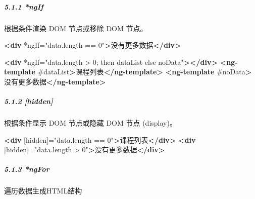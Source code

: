\documentclass[
]{article}
\newenvironment{Shaded}{}{}
\newcommand{\KeywordTok}[1]{\textcolor[rgb]{0.00,0.44,0.13}{\textbf{#1}}}
\newcommand{\NormalTok}[1]{#1}
\newcommand{\OtherTok}[1]{\textcolor[rgb]{0.00,0.44,0.13}{#1}}
\newcommand{\StringTok}[1]{\textcolor[rgb]{0.25,0.44,0.63}{#1}}
\begin{document}
\hypertarget{511-ngif}{%
\subparagraph{\texorpdfstring{5.1.1 *ngIf
}{5.1.1 *ngIf }}\label{511-ngif}}

根据条件渲染 DOM 节点或移除 DOM 节点。

\begin{Shaded}
\begin{Highlighting}[]
\KeywordTok{\textless{}div}\OtherTok{ *ngIf=}\StringTok{"data.length == 0"}\KeywordTok{\textgreater{}}\NormalTok{没有更多数据}\KeywordTok{\textless{}/div\textgreater{}}
\end{Highlighting}
\end{Shaded}

\begin{Shaded}
\begin{Highlighting}[]
\KeywordTok{\textless{}div}\OtherTok{ *ngIf=}\StringTok{"data.length \textgreater{} 0; then dataList else noData"}\KeywordTok{\textgreater{}\textless{}/div\textgreater{}}
\KeywordTok{\textless{}ng{-}template}\OtherTok{ \#dataList}\KeywordTok{\textgreater{}}\NormalTok{课程列表}\KeywordTok{\textless{}/ng{-}template\textgreater{}}
\KeywordTok{\textless{}ng{-}template}\OtherTok{ \#noData}\KeywordTok{\textgreater{}}\NormalTok{没有更多数据}\KeywordTok{\textless{}/ng{-}template\textgreater{}}
\end{Highlighting}
\end{Shaded}

\hypertarget{512-hidden}{%
\subparagraph{5.1.2 {[}hidden{]}}\label{512-hidden}}

根据条件显示 DOM 节点或隐藏 DOM 节点 (display)。

\begin{Shaded}
\begin{Highlighting}[]
\KeywordTok{\textless{}div}\OtherTok{ [hidden]=}\StringTok{"data.length == 0"}\KeywordTok{\textgreater{}}\NormalTok{课程列表}\KeywordTok{\textless{}/div\textgreater{}}
\KeywordTok{\textless{}div}\OtherTok{ [hidden]=}\StringTok{"data.length \textgreater{} 0"}\KeywordTok{\textgreater{}}\NormalTok{没有更多数据}\KeywordTok{\textless{}/div\textgreater{}}
\end{Highlighting}
\end{Shaded}

\hypertarget{513-ngfor}{%
\subparagraph{5.1.3 *ngFor}\label{513-ngfor}}

遍历数据生成HTML结构
\end{document}
